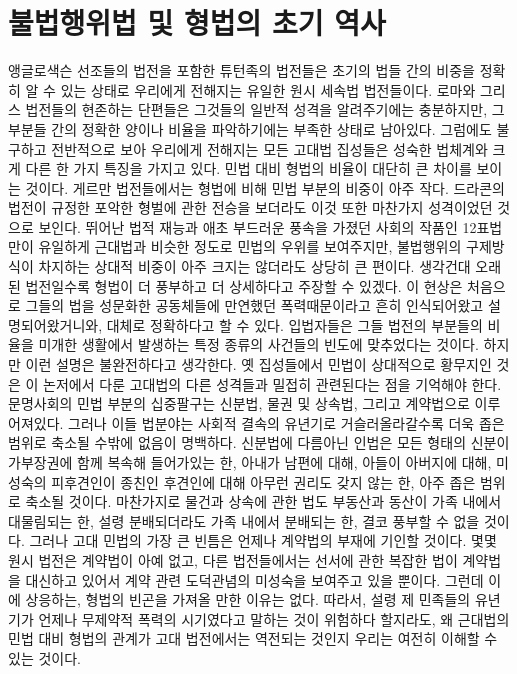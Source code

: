 \chapter{불법행위법 및 형법의 초기 역사}

앵글로색슨 선조들의 법전을 포함한
튜턴족의 법전들은
초기의 법들 간의 비중을 정확히 알 수 있는 상태로
우리에게 전해지는
유일한 원시 세속법 법전들이다.
로마와 그리스 법전들의 현존하는 단편들은
그것들의 일반적 성격을 알려주기에는 충분하지만,
그 부분들 간의 정확한 양이나 비율을 파악하기에는 부족한 상태로 남아있다.
그럼에도 불구하고 전반적으로 보아
우리에게 전해지는 모든 고대법 집성들은
성숙한 법체계와 크게 다른 한 가지 특징을 가지고 있다.
민법 대비 형법의 비율이 대단히 큰 차이를 보이는 것이다.
게르만 법전들에서는 형법에 비해 민법 부분의 비중이 아주 작다.
드라콘의 법전이 규정한 포악한 형벌에 관한 전승을 보더라도
이것 또한 마찬가지 성격이었던 것으로 보인다.
뛰어난 법적 재능과 애초 부드러운 풍속을 가졌던 사회의 작품인
12표법만이 유일하게
근대법과 비슷한 정도로 민법의 우위를 보여주지만,
불법행위의 구제방식이 차지하는 상대적 비중이
아주 크지는 않더라도 상당히 큰 편이다.
생각건대
오래된 법전일수록 형법이 더 풍부하고 더 상세하다고
주장할 수 있겠다.
이 현상은
처음으로 그들의 법을 성문화한 공동체들에 만연했던 폭력때문이라고
흔히
인식되어왔고 설명되어왔거니와,
대체로 정확하다고 할 수 있다.
입법자들은
그들 법전의 부분들의 비율을
미개한 생활에서 발생하는 특정 종류의 사건들의 빈도에 맞추었다는 것이다.
하지만
이런 설명은 불완전하다고 생각한다.
옛 집성들에서 민법이 상대적으로 황무지인 것은
이 논저에서 다룬 고대법의 다른 성격들과 밀접히 관련된다는 점을 기억해야 한다.
문명사회의 민법 부분의 십중팔구는
신분법, 물권 및 상속법, 그리고 계약법으로 이루어져있다.
그러나
이들 법분야는
사회적 결속의 유년기로 거슬러올라갈수록
더욱 좁은 범위로 축소될 수밖에 없음이 명백하다.
신분법에 다름아닌 인법은
모든 형태의 신분이 가부장권에 함께 복속해 들어가있는 한,
아내가 남편에 대해,
아들이 아버지에 대해,
미성숙의 피후견인이 종친인 후견인에 대해
아무런 권리도 갖지 않는 한,
아주 좁은 범위로 축소될 것이다.
마찬가지로
물건과 상속에 관한 법도
부동산과 동산이 가족 내에서 대물림되는 한,
설령 분배되더라도 가족 내에서 분배되는 한,
결코 풍부할 수 없을 것이다.
그러나 고대 민법의 가장 큰 빈틈은
언제나 계약법의 부재에 기인할 것이다.
몇몇 원시 법전은 계약법이 아예 없고,
다른 법전들에서는
선서에 관한 복잡한 법이 계약법을 대신하고 있어서
계약 관련
도덕관념의 미성숙을 보여주고 있을 뿐이다.
그런데 이에 상응하는,
형법의 빈곤을 가져올 만한 이유는 없다.
따라서,
설령 제 민족들의 유년기가 언제나 무제약적 폭력의 시기였다고 말하는 것이
위험하다 할지라도,
왜 근대법의 민법 대비 형법의 관계가 고대 법전에서는 역전되는 것인지
우리는 여전히 이해할 수 있는 것이다.

